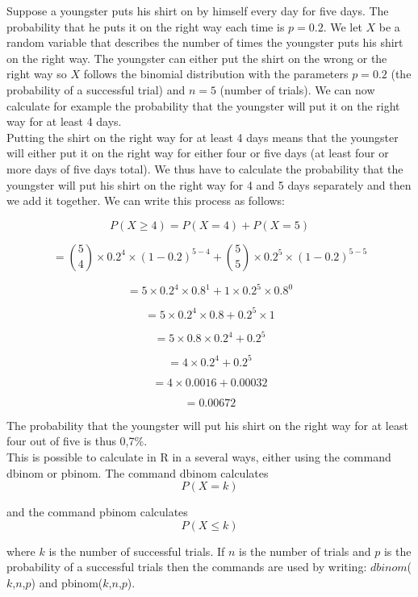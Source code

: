 \documentclass[12pt,a4paper]{article}
\theoremstyle{regla}
\theoremstyle{remark}
\theoremstyle{definition}
\theoremstyle{nonumberbreak}
\begin{document}
\begin{xmpl} 
Suppose a youngster puts his shirt on by himself every day for five days. The probability that he puts it on the right way each time is $p=0.2$. We let $X$ be a random variable that describes the number of times the youngster puts his shirt on the right way. The youngster can either put the shirt on the wrong or the right way so $X$ follows the binomial distribution with the parameters $p=0.2$ (the probability of a successful trial) and $n=5$ (number of trials). We can now calculate for example the probability that the youngster will put it on the right way for at least 4 days.\\

Putting the shirt on the right way for at least 4 days means that the youngster will either put it on the right way for either four or five days (at least four or more days of five days total). We thus have to calculate the probability that the youngster will put his shirt on the right way for 4 and 5 days separately and then we add it together. We can write this process as follows:

$$P(X\geq4) = P(X=4) + P(X=5)$$

$$= \binom{5}{4}\times0.2^4\times(1-0.2)^{5-4} + \binom{5}{5}\times0.2^5\times(1-0.2)^{5-5}$$

$$= 5\times0.2^4\times0.8^1 + 1\times0.2^5\times0.8^0$$

$$= 5\times0.2^4\times0.8 + 0.2^5\times1$$

$$= 5\times0.8 \times0.2^4 + 0.2^5 $$

$$= 4\times0.2^4 + 0.2^5$$

 

$$= 4\times0.0016 + 0.00032$$

$$= 0.00672$$

The probability that the youngster will put his shirt on the right way for at least four out of five is thus 0,7\%.\\

This is possible to calculate in R in a several ways, either using the command dbinom or pbinom. The command dbinom calculates $$P(X = k)$$

and the command pbinom calculates $$P(X \leq k)$$

where $k$ is the number of successful trials. If $n$ is the number of trials and $p$ is the probability of a successful trials then the commands are used by writing: $dbinom$($k$,$n$,$p$) and pbinom($k$,$n$,$p$).\\


\end{xmpl}
\end{document}
